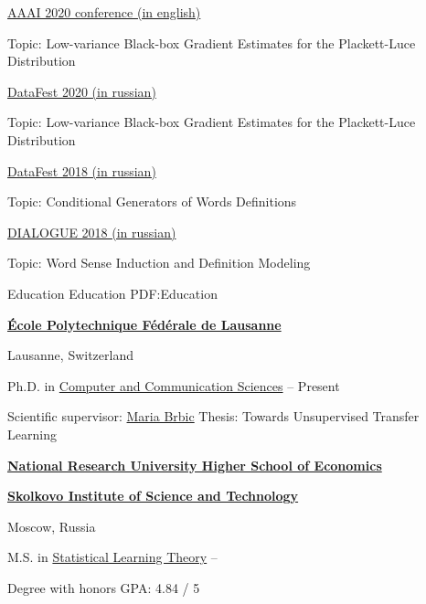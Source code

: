 \documentclass[letterpaper,MMMyyyy,nonstopmode]{simpleresumecv}
\begin{document}
\begin{Body}
\Item
\href{https://aaai.org/Conferences/AAAI-20/}{AAAI 2020 conference (in english)}
\hfill
{}
\begin{Detail}
\Item
Topic: Low-variance Black-box Gradient Estimates for the Plackett-Luce Distribution
\end{Detail}

\Item
\href{http://datafest.ru}{DataFest 2020 (in russian)}
\hfill
{}
\begin{Detail}
\Item
Topic: Low-variance Black-box Gradient Estimates for the Plackett-Luce Distribution
\end{Detail}

\Item
\href{http://datafest.ru}{DataFest 2018 (in russian)}
\hfill
{}
\begin{Detail}
\Item
Topic: Conditional Generators of Words Definitions
\end{Detail}

\Gap
\Item
\href{http://www.dialog-21.ru/en/}{DIALOGUE 2018 (in russian)}
\hfill
{}
\begin{Detail}
\Item
Topic: Word Sense Induction and Definition Modeling
\end{Detail}




\Section
{Education}
{Education}
{PDF:Education}

\Entry
\href{https://www.epfl.ch/}
{\textbf{École Polytechnique Fédérale de Lausanne}}
\par
Lausanne, Switzerland

\Gap
\BulletItem
Ph.D. in
\href{https://www.epfl.ch/schools/ic/}
{Computer and Communication Sciences}
\hfill
{} --
Present
\begin{Detail}
\SubBulletItem
Scientific supervisor: \href{https://people.epfl.ch/maria.brbic?lang=en}{Maria Brbic}
\SubBulletItem
Thesis: Towards Unsupervised Transfer Learning
\end{Detail}
\Gap

\Entry
\href{https://www.hse.ru/en/}
{\textbf{National Research University Higher School of Economics}}
\par
\href{https://www.skoltech.ru/en/}{\textbf{Skolkovo Institute of Science and Technology}}
\par
Moscow, Russia

\Gap
\BulletItem
M.S. in
\href{https://www.hse.ru/en/ma/sltheory/}
{Statistical Learning Theory}
\hfill
{} --
\begin{Detail}
\SubBulletItem
Degree with honors
\SubBulletItem
GPA: 4.84 / 5
\end{Detail}
\Gap


\end{Body}
\end{document}
